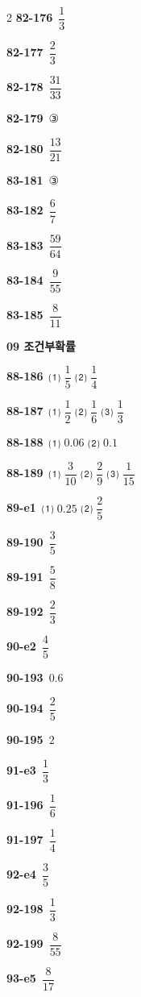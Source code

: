 \documentclass[10pt,a4paper]{article}
\begin{document}
\begin{multicols}{2}
\noindent\textbf{82-176}\ $\dfrac{1}{3}$\par
\noindent\textbf{82-177}\ $\dfrac{2}{3}$\par
\noindent\textbf{82-178}\ $\dfrac{31}{33}$\par
\noindent\textbf{82-179}\ ③\par
\noindent\textbf{82-180}\ $\dfrac{13}{21}$\par
\noindent\textbf{83-181}\ ③\par
\noindent\textbf{83-182}\ $\dfrac{6}{7}$\par
\noindent\textbf{83-183}\ $\dfrac{59}{64}$\par
\noindent\textbf{83-184}\ $\dfrac{9}{55}$\par
\noindent\textbf{83-185}\ $\dfrac{8}{11}$\par
\noindent\textbf{09 조건부확률}\par\smallskip
\noindent\textbf{88-186}\ ⑴ $\dfrac{1}{5}$ ⑵ $\dfrac{1}{4}$\par
\noindent\textbf{88-187}\ ⑴ $\dfrac{1}{2}$ ⑵ $\dfrac{1}{6}$ ⑶ $\dfrac{1}{3}$\par
\noindent\textbf{88-188}\ ⑴ $0.06$ ⑵ $0.1$\par
\noindent\textbf{88-189}\ ⑴ $\dfrac{3}{10}$ ⑵ $\dfrac{2}{9}$ ⑶ $\dfrac{1}{15}$\par
\noindent\textbf{89-e1}\ ⑴ $0.25$ ⑵ $\dfrac{2}{5}$\par
\noindent\textbf{89-190}\ $\dfrac{3}{5}$\par
\noindent\textbf{89-191}\ $\dfrac{5}{8}$\par
\noindent\textbf{89-192}\ $\dfrac{2}{3}$\par
\noindent\textbf{90-e2}\ $\dfrac{4}{5}$\par
\noindent\textbf{90-193}\ $0.6$\par
\noindent\textbf{90-194}\ $\dfrac{2}{5}$\par
\noindent\textbf{90-195}\ $2$\par
\noindent\textbf{91-e3}\ $\dfrac{1}{3}$\par
\noindent\textbf{91-196}\ $\dfrac{1}{6}$\par
\noindent\textbf{91-197}\ $\dfrac{1}{4}$\par
\noindent\textbf{92-e4}\ $\dfrac{3}{5}$\par
\noindent\textbf{92-198}\ $\dfrac{1}{3}$\par
\noindent\textbf{92-199}\ $\dfrac{8}{55}$\par
\noindent\textbf{93-e5}\ $\dfrac{8}{17}$\par

\end{multicols}
\end{document}
